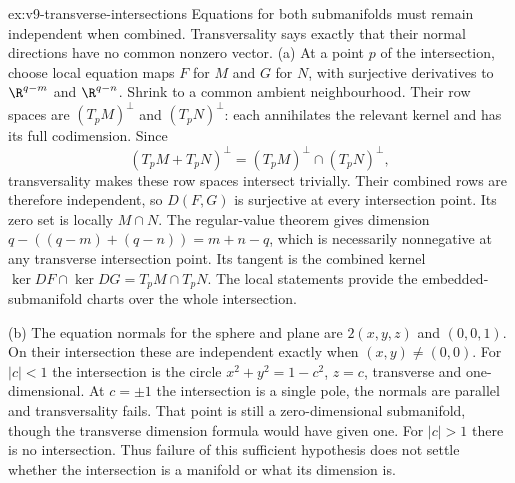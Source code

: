 \begin{solution}{ex:v9-transverse-intersections}
\idea Equations for both submanifolds must remain independent when combined. Transversality says exactly that their normal directions have no common nonzero vector.
\writeup (a) At a point $p$ of the intersection, choose local equation maps $F$ for $M$ and $G$ for $N$, with surjective derivatives to $\R^{q-m}$ and $\R^{q-n}$. Shrink to a common ambient neighbourhood. Their row spaces are $(T_pM)^\perp$ and $(T_pN)^\perp$: each annihilates the relevant kernel and has its full codimension. Since
\[
(T_pM+T_pN)^\perp=(T_pM)^\perp\cap(T_pN)^\perp,
\]
transversality makes these row spaces intersect trivially. Their combined rows are therefore independent, so $D(F,G)$ is surjective at every intersection point. Its zero set is locally $M\cap N$. The regular-value theorem gives dimension
$q-((q-m)+(q-n))=m+n-q$, which is necessarily nonnegative at any transverse intersection point. Its tangent is the combined kernel $\ker DF\cap\ker DG=T_pM\cap T_pN$. The local statements provide the embedded-submanifold charts over the whole intersection.

(b) The equation normals for the sphere and plane are $2(x,y,z)$ and $(0,0,1)$. On their intersection these are independent exactly when $(x,y)\ne(0,0)$. For $|c|<1$ the intersection is the circle $x^2+y^2=1-c^2$, $z=c$, transverse and one-dimensional. At $c=\pm1$ the intersection is a single pole, the normals are parallel and transversality fails. That point is still a zero-dimensional submanifold, though the transverse dimension formula would have given one. For $|c|>1$ there is no intersection. Thus failure of this sufficient hypothesis does not settle whether the intersection is a manifold or what its dimension is.
\end{solution}


